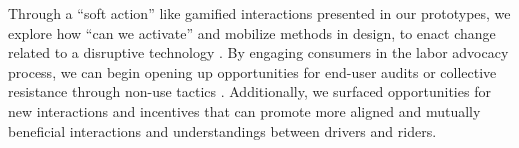Through a ``soft action'' like gamified interactions presented in our prototypes, we explore how ``can we activate'' and mobilize methods in design, to enact change related to a disruptive technology \cite{considerations}.
By engaging consumers in the labor advocacy process, we can begin opening up opportunities for end-user audits \cite{eu_audits} or collective resistance through non-use tactics \cite{non_use}. Additionally, we surfaced opportunities for new interactions and incentives that can promote more aligned and mutually beneficial interactions and understandings between drivers and riders.
